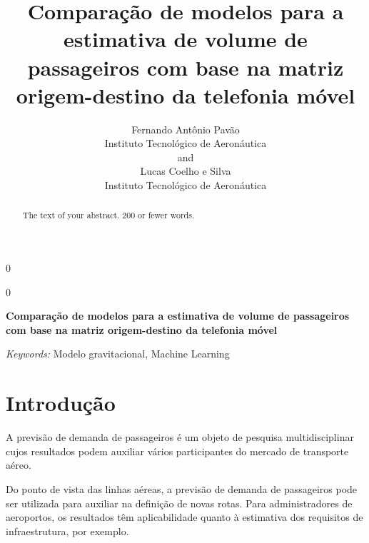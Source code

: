 \documentclass[12pt]{article}
\newcommand{\blind}{0}
\begin{document}
\def\spacingset#1{\renewcommand{\baselinestretch}%
{#1}\small\normalsize} \spacingset{1}



\blind
{
  \title{\bf Comparação de modelos para a estimativa de volume de passageiros com
base na matriz origem-destino da telefonia móvel}

  \author{
        Fernando Antônio Pavão \\
    Instituto Tecnológico de Aeronáutica\\
     and \\     Lucas Coelho e Silva \\
    Instituto Tecnológico de Aeronáutica\\
      }
  \maketitle
} \fi

\blind
{
  \bigskip
  \bigskip
  \bigskip
  \begin{center}
    {\LARGE\bf Comparação de modelos para a estimativa de volume de passageiros com
base na matriz origem-destino da telefonia móvel}
  \end{center}
  \medskip
} \fi

\bigskip
\begin{abstract}
The text of your abstract. 200 or fewer words.
\end{abstract}

\noindent%
{\it Keywords:} Modelo gravitacional, Machine Learning
\vfill

\newpage
\spacingset{1.45} %

\hypertarget{introduuxe7uxe3o}{%
\section{Introdução}\label{introduuxe7uxe3o}}

A previsão de demanda de passageiros é um objeto de pesquisa
multidisciplinar cujos resultados podem auxiliar vários participantes do
mercado de transporte aéreo.

Do ponto de vista das linhas aéreas, a previsão de demanda de
passageiros pode ser utilizada para auxiliar na definição de novas
rotas. Para administradores de aeroportos, os resultados têm
aplicabilidade quanto à estimativa dos requisitos de infraestrutura, por
exemplo.
\end{document}
